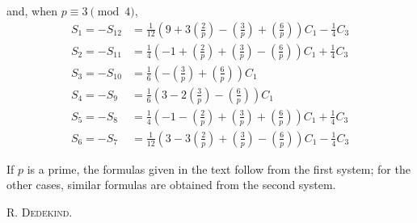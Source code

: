 and, when $p\equiv3\pmod4$,
\[
\begin{aligned}
S_1=-S_{12}&=\tfrac1{12}\left(9+3\left(\frac2p\right)-\left(\frac3p\right)+\left(\frac6p\right)\right)C_1-\tfrac14C_3\\
S_2=-S_{11}&=\tfrac14\left(-1+\left(\frac2p\right)+\left(\frac3p\right)-\left(\frac6p\right)\right)C_1+\tfrac14C_3\\
S_3=-S_{10}&=\tfrac16\left(-\left(\frac3p\right)+\left(\frac6p\right)\right)C_1\\
S_4=-S_9&=\tfrac16\left(3-2\left(\frac3p\right)-\left(\frac6p\right)\right)C_1\\
S_5=-S_8&=\tfrac14\left(-1-\left(\frac2p\right)+\left(\frac3p\right)+\left(\frac6p\right)\right)C_1+\tfrac14C_3\\
S_6=-S_7&=\tfrac1{12}\left(3-3\left(\frac2p\right)+\left(\frac3p\right)-\left(\frac6p\right)\right)C_1-\tfrac14C_3
\end{aligned}
\]

If $p$ is a prime, the formulas given in the text follow from the first system; for the other cases, similar formulas are obtained from the second system.
\begin{flushright}\textsc{R. Dedekind.}\end{flushright}
\BookRule{55mm}
